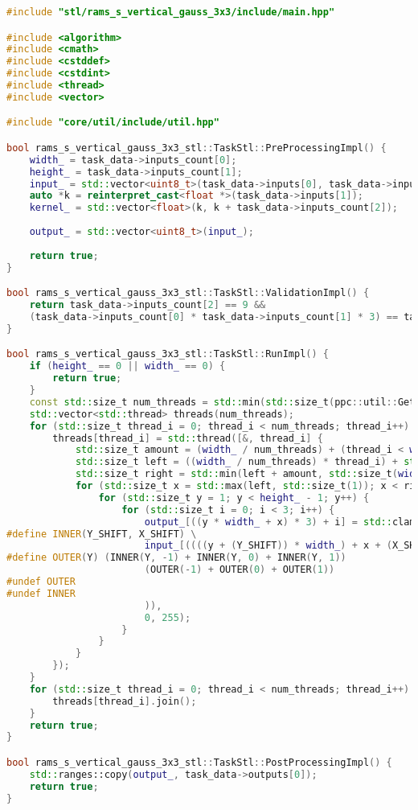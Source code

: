 \documentclass[12pt]{article}
\begin{document}
\begin{lstlisting}[language=C++]
#include "stl/rams_s_vertical_gauss_3x3/include/main.hpp"

#include <algorithm>
#include <cmath>
#include <cstddef>
#include <cstdint>
#include <thread>
#include <vector>

#include "core/util/include/util.hpp"

bool rams_s_vertical_gauss_3x3_stl::TaskStl::PreProcessingImpl() {
	width_ = task_data->inputs_count[0];
	height_ = task_data->inputs_count[1];
	input_ = std::vector<uint8_t>(task_data->inputs[0], task_data->inputs[0] + (height_ * width_ * 3));
	auto *k = reinterpret_cast<float *>(task_data->inputs[1]);
	kernel_ = std::vector<float>(k, k + task_data->inputs_count[2]);
	
	output_ = std::vector<uint8_t>(input_);
	
	return true;
}

bool rams_s_vertical_gauss_3x3_stl::TaskStl::ValidationImpl() {
	return task_data->inputs_count[2] == 9 &&
	(task_data->inputs_count[0] * task_data->inputs_count[1] * 3) == task_data->outputs_count[0];
}

bool rams_s_vertical_gauss_3x3_stl::TaskStl::RunImpl() {
	if (height_ == 0 || width_ == 0) {
		return true;
	}
	const std::size_t num_threads = std::min(std::size_t(ppc::util::GetPPCNumThreads()), std::size_t(width_));
	std::vector<std::thread> threads(num_threads);
	for (std::size_t thread_i = 0; thread_i < num_threads; thread_i++) {
		threads[thread_i] = std::thread([&, thread_i] {
			std::size_t amount = (width_ / num_threads) + (thread_i < width_ % num_threads ? 1 : 0);
			std::size_t left = ((width_ / num_threads) * thread_i) + std::min(width_ % num_threads, thread_i);
			std::size_t right = std::min(left + amount, std::size_t(width_) - 1);
			for (std::size_t x = std::max(left, std::size_t(1)); x < right; x++) {
				for (std::size_t y = 1; y < height_ - 1; y++) {
					for (std::size_t i = 0; i < 3; i++) {
						output_[((y * width_ + x) * 3) + i] = std::clamp(static_cast<int>(std::round(
#define INNER(Y_SHIFT, X_SHIFT) \
						input_[((((y + (Y_SHIFT)) * width_) + x + (X_SHIFT)) * 3) + i] * kernel_[4 + (3 * (Y_SHIFT)) + (X_SHIFT)]
#define OUTER(Y) (INNER(Y, -1) + INNER(Y, 0) + INNER(Y, 1))
						(OUTER(-1) + OUTER(0) + OUTER(1))
#undef OUTER
#undef INNER
						)),
						0, 255);
					}
				}
			}
		});
	}
	for (std::size_t thread_i = 0; thread_i < num_threads; thread_i++) {
		threads[thread_i].join();
	}
	return true;
}

bool rams_s_vertical_gauss_3x3_stl::TaskStl::PostProcessingImpl() {
	std::ranges::copy(output_, task_data->outputs[0]);
	return true;
}
\end{lstlisting}
\end{document}
